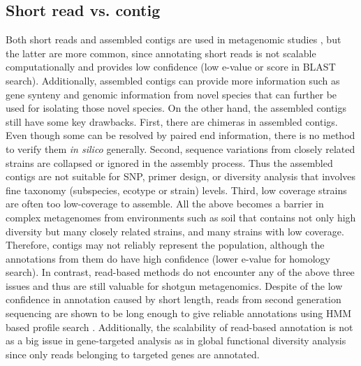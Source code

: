 \documentclass[]{msu-thesis}
\begin{document}
\subsection{Short read vs. contig}
Both short reads and assembled contigs are used in metagenomic studies
\cite{fierer_cross-biome_2012,qin_human_2010,howe_tackling_2014}, but
the latter are more common, since annotating short reads is not
scalable computationally and provides low confidence (low e-value or
score in BLAST search). Additionally, assembled contigs can provide more
information such as gene synteny and genomic information from novel
species that can further be used for isolating those novel species.
On the other hand, the assembled contigs still have some key drawbacks.
First, there are chimeras in assembled contigs. Even though some can be
resolved by paired end information, there is no method to verify them
\textit{in silico} generally. Second, sequence variations from closely
related strains are collapsed or ignored in the assembly process. Thus
the assembled contigs are not suitable for SNP, primer design, or
diversity analysis that involves fine taxonomy (subspecies, ecotype or
strain)
levels. Third, low coverage strains are often too low-coverage to
assemble. All the above becomes a barrier in complex
metagenomes from environments such as soil that contains not only high
diversity but many closely related strains, and many strains with low
coverage. Therefore, contigs may not reliably represent the
population, although the annotations from them do have high confidence
(lower e-value for homology search). In contrast, read-based
methods do not encounter any of the above three issues and thus are
still valuable for shotgun metagenomics. Despite of the low confidence
in annotation caused by short length, reads from second generation
sequencing are shown to be long enough to give reliable annotations
using HMM based profile search \cite{zhang_metadomain:_2012}.
Additionally, the scalability of read-based annotation is not as a big
issue in gene-targeted analysis as in global functional diversity
analysis since only reads belonging to targeted genes are annotated.

\end{document}
